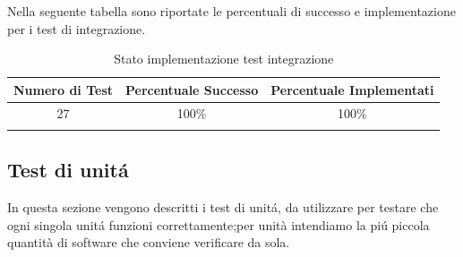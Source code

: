 \documentclass[../PianoDiQualifica.tex]{subfiles}
\begin{document}
Nella seguente tabella sono riportate le percentuali di successo e implementazione per i test di integrazione.
\normalsize
\begin{longtable}{|c|c|c|}
	\hline
	\textbf{Numero di Test} & \textbf{Percentuale Successo} & \textbf{Percentuale Implementati}\\
	\hline
	\endhead
	27 & 100\% & 100\%\\
	\hline
	\caption[Stato implementazione test integrazione]{Stato implementazione test integrazione}
	\label{tabella:Stato implementazione test integrazione}
\end{longtable}
	
		\newpage
		\subsection{Test di unit\'a} 
		In questa sezione vengono descritti i test di unit\'a, da utilizzare per testare che ogni singola unit\'a funzioni correttamente;per unità intendiamo la pi\'u piccola quantità di software che conviene verificare da sola.
		
\end{document}
